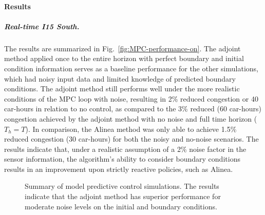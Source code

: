 \paragraph{Results}
								
\subparagraph{Real-time I15 South.}
								
The results are summarized in Fig.~\ref{fig:MPC-performance-on}.
The adjoint method applied once to the entire horizon with perfect
boundary and initial condition information serves as a baseline performance
for the other simulations, which had noisy input data and limited
knowledge of predicted boundary conditions. The adjoint method still
performs well under the more realistic conditions of the MPC loop
with noise, resulting in 2\% reduced congestion or 40 car-hours in relation to no control, as compared to the 3\% reduced (60 car-hours) congestion achieved by the adjoint method with no noise and full time horizon ($T_h=T$). In comparison, the Alinea method was only able to achieve 1.5\% reduced congestion (30 car-hours) for both the noisy and no-noise scenarios. The results indicate
that, under a realistic assumption of a 2\% noise factor in the sensor
information, the algorithm's ability to consider boundary conditions results in an improvement upon strictly reactive policies,
such as Alinea.
								
\begin{figure}
	\hfill{}
	\caption{Summary of model predictive control simulations. The results indicate that the adjoint method has superior performance for moderate noise levels on the initial and boundary conditions.}
\end{figure}
								
